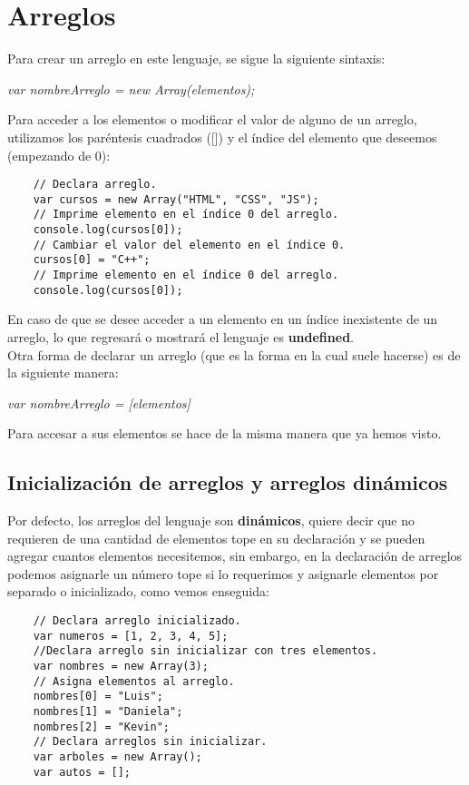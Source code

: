 \section{Arreglos}
\hspace{0.55cm}Para crear un arreglo en este lenguaje, se sigue la siguiente sintaxis:
\begin{center}
    \textit{var nombreArreglo = new Array(elementos);}
\end{center}

Para acceder a los elementos o modificar el valor de alguno de un arreglo, utilizamos los paréntesis cuadrados ([]) y el índice del elemento que deseemos (empezando de 0):
\begin{lstlisting}
    // Declara arreglo.
    var cursos = new Array("HTML", "CSS", "JS");
    // Imprime elemento en el índice 0 del arreglo.
    console.log(cursos[0]);
    // Cambiar el valor del elemento en el índice 0.
    cursos[0] = "C++";
    // Imprime elemento en el índice 0 del arreglo.
    console.log(cursos[0]);
\end{lstlisting}

En caso de que se desee acceder a un elemento en un índice inexistente de un arreglo, lo que regresará o mostrará el lenguaje es \textbf{undefined}.\\
Otra forma de declarar un arreglo (que es la forma en la cual suele hacerse) es de la siguiente manera:
\begin{center}
    \textit{var nombreArreglo = [elementos]}
\end{center}

Para accesar a sus elementos se hace de la misma manera que ya hemos visto.


\subsection{Inicialización de arreglos y arreglos dinámicos}
\hspace{0.55cm}Por defecto, los arreglos del lenguaje son \textbf{dinámicos}, quiere decir que no requieren de una cantidad de elementos tope en su declaración y se pueden agregar cuantos elementos necesitemos, sin embargo, en la declaración de arreglos podemos asignarle un número tope si lo requerimos y asignarle elementos por separado o inicializado, como vemos enseguida:
\begin{lstlisting}
    // Declara arreglo inicializado.
    var numeros = [1, 2, 3, 4, 5];
    //Declara arreglo sin inicializar con tres elementos.
    var nombres = new Array(3);
    // Asigna elementos al arreglo.
    nombres[0] = "Luis";
    nombres[1] = "Daniela";
    nombres[2] = "Kevin";
    // Declara arreglos sin inicializar.
    var arboles = new Array();
    var autos = [];
\end{lstlisting}


